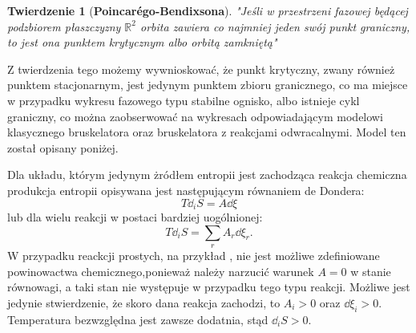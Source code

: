 \documentclass[10pt, a4paper, twoside, onecolumn]{article}
\numberwithin{equation}{section}
\newtheorem*{theorem}{Twierdzenie}
\begin{document}
	\begin{theorem}[\textbf{Poincar\'{e}go-Bendixsona}]
		"Jeśli w przestrzeni fazowej będącej podzbiorem płaszczyzny \(\mathbb{R}^{2}\) orbita zawiera co najmniej jeden swój punkt graniczny, to jest ona punktem krytycznym albo orbitą zamkniętą" \cite{palczewski}
	\end{theorem}
	Z twierdzenia tego możemy wywnioskować, że punkt krytyczny, zwany również punktem stacjonarnym, jest jedynym punktem zbioru granicznego, co ma miejsce w przypadku wykresu fazowego typu stabilne ognisko, albo istnieje cykl graniczny, co można zaobserwować na wykresach odpowiadającym modelowi klasycznego bruskelatora oraz bruskelatora z reakcjami odwracalnymi. Model ten został opisany poniżej. \par
	Dla układu, którym jedynym żródłem entropii jest zachodząca reakcja chemiczna produkcja entropii opisywana jest następującym równaniem de Dondera:
	\begin{equation}\label{de donder}
		T\dd_{i}S=A\dd{\xi}
	\end{equation}
	lub dla wielu reakcji w postaci bardziej uogólnionej: 
	\begin{equation}\label{de donder ogolny}
		T\dd_{i}S=\sum_{r}A_{r}\dd{\xi_{r}}.
	\end{equation}
	W przypadku reackcji prostych, na przykład , nie jest możliwe zdefiniowane powinowactwa chemicznego,ponieważ należy narzucić warunek \(A=0\) w stanie równowagi, a taki stan nie występuje w przypadku tego typu reakcji. Możliwe jest jedynie stwierdzenie, że skoro dana reakcja zachodzi, to \(A_{i}>0\) oraz \(\dd{\xi_{i}}>0\). Temperatura bezwzględna jest zawsze dodatnia, stąd \(\dd_{i}S>0\). \par
	
\end{document}
